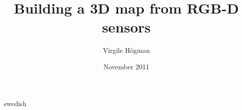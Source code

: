 \documentclass[a4paper,11pt]{kth-mag}
\title{Building a 3D map from RGB-D sensors}
\author{Virgile H\"{o}gman}
\date{November 2011}
\begin{document}
\frontmatter
\pagestyle{empty}
\removepagenumbers
\maketitle

\clearpage
{}
\begin{abstract}

\end{abstract}
\clearpage
\begin{foreignabstract}{swedish}

\end{foreignabstract}
\clearpage


\cleardoublepage
\tableofcontents



\mainmatter

\pagestyle{newchap}


\clearpage
{}
\printglossaries


\cleardoublepage
\renewcommand{\bibname}{References}

%  

\end{document}
